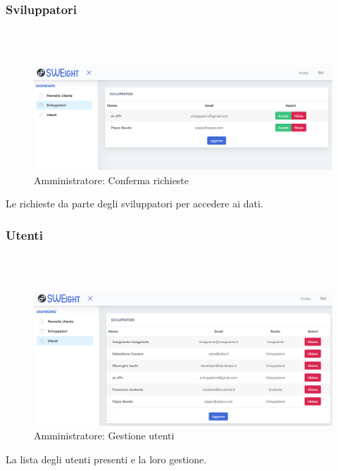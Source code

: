 		\subsubsection{Sviluppatori}\mbox{}\\ \\
			\begin{figure}[H]
			\centering
			\includegraphics[width=17cm]{sez/img/amministratore/conf_ric_svil.PNG}
			\caption{Amministratore: Conferma richieste}\label{fig:1}
			\end{figure}
		  Le richieste da parte degli sviluppatori per accedere ai dati.


		\subsubsection{Utenti}\mbox{}\\ \\
			\begin{figure}[H]
			\centering
			\includegraphics[width=17cm]{sez/img/amministratore/gestisciutenti.PNG}
			\caption{Amministratore: Gestione utenti}\label{fig:1}
			\end{figure}
		  La lista degli utenti presenti e la loro gestione.
